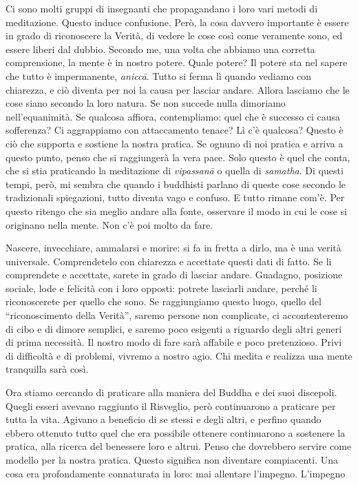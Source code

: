Ci sono molti gruppi di insegnanti che propagandano i loro vari metodi
di meditazione. Questo induce confusione. Però, la cosa davvero
importante è essere in grado di riconoscere la Verità, di vedere le cose
così come veramente sono, ed essere liberi dal dubbio. Secondo me, una
volta che abbiamo una corretta comprensione, la mente è in nostro
potere. Quale potere? Il potere sta nel sapere che tutto è impermanente,
\emph{aniccā}. Tutto si ferma lì quando vediamo con chiarezza, e ciò
diventa per noi la causa per lasciar andare. Allora lasciamo che le cose
siano secondo la loro natura. Se non succede nulla dimoriamo
nell'equanimità. Se qualcosa affiora, contempliamo: quel che è successo
ci causa sofferenza? Ci aggrappiamo con attaccamento tenace? Lì c'è
qualcosa? Questo è ciò che supporta e sostiene la nostra pratica. Se
ognuno di noi pratica e arriva a questo punto, penso che si raggiungerà
la vera pace. Solo questo è quel che conta, che si stia praticando la
meditazione di \emph{vipassanā} o quella di \emph{samatha}. Di questi
tempi, però, mi sembra che quando i buddhisti parlano di queste cose
secondo le tradizionali spiegazioni, tutto diventa vago e confuso. E
tutto rimane com'è. Per questo ritengo che sia meglio andare alla fonte,
osservare il modo in cui le cose si originano nella mente. Non c'è poi
molto da fare.

Nascere, invecchiare, ammalarsi e morire: si fa in fretta a dirlo, ma è
una verità universale. Comprendetelo con chiarezza e accettate questi
dati di fatto. Se li comprendete e accettate, sarete in grado di lasciar
andare. Guadagno, posizione sociale, lode e felicità con i loro opposti:
potrete lasciarli andare, perché li riconoscerete per quello che sono.
Se raggiungiamo questo luogo, quello del ``riconoscimento della
Verità'', saremo persone non complicate, ci accontenteremo di cibo e di
dimore semplici, e saremo poco esigenti a riguardo degli altri generi di
prima necessità. Il nostro modo di fare sarà affabile e poco
pretenzioso. Privi di difficoltà e di problemi, vivremo a nostro agio.
Chi medita e realizza una mente tranquilla sarà così.

Ora stiamo cercando di praticare alla maniera del Buddha e dei suoi
discepoli. Quegli esseri avevano raggiunto il Risveglio, però
continuarono a praticare per tutta la vita. Agivano a beneficio di se
stessi e degli altri, e perfino quando ebbero ottenuto tutto quel che
era possibile ottenere continuarono a sostenere la pratica, alla ricerca
del benessere loro e altrui. Penso che dovrebbero servire come modello
per la nostra pratica. Questo significa non diventare compiacenti. Una
cosa era profondamente connaturata in loro: mai allentare l'impegno.
L'impegno era nel loro modo di essere, una loro naturale abitudine. Così
è il carattere dei saggi, dei veri praticanti. Lo si può paragonare alla
gente ricca e a quella povera. I ricchi sono particolarmente laboriosi,
molto più dei poveri. E meno sforzi i poveri fanno, ancora minori sono
le loro possibilità di diventare ricchi. I ricchi sanno e hanno
esperienza di molte cose, e così hanno l'abitudine di essere diligenti
in tutto quel che fanno.\footnote{Ovviamente si fa riferimento a una
  società contadina, nella quale la ricchezza proveniva dal lavoro e
  dall'abilità di gestire i pochi mezzi a disposizione.}

